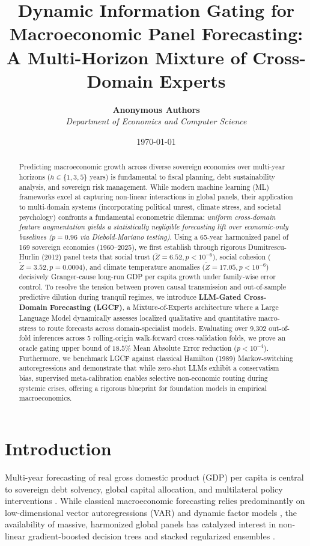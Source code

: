 \documentclass[11pt,a4paper]{article}
\title{\textbf{Dynamic Information Gating for Macroeconomic Panel Forecasting:\\A Multi-Horizon Mixture of Cross-Domain Experts}}
\author{
  \textbf{Anonymous Authors} \\
  \textit{Department of Economics and Computer Science}
}
\date{\today}
\begin{document}
\maketitle

\begin{abstract}
Predicting macroeconomic growth across diverse sovereign economies over multi-year horizons ($h \in \{1, 3, 5\}$ years) is fundamental to fiscal planning, debt sustainability analysis, and sovereign risk management. While modern machine learning (ML) frameworks excel at capturing non-linear interactions in global panels, their application to multi-domain systems (incorporating political unrest, climate stress, and societal psychology) confronts a fundamental econometric dilemma: \textit{uniform cross-domain feature augmentation yields a statistically negligible forecasting lift over economic-only baselines ($p = 0.96$ via Diebold-Mariano testing)}. Using a 65-year harmonized panel of 169 sovereign economies (1960--2025), we first establish through rigorous Dumitrescu-Hurlin (2012) panel tests that social trust ($\tilde{Z} = 6.52, p < 10^{-6}$), social cohesion ($\tilde{Z} = 3.52, p = 0.0004$), and climate temperature anomalies ($\tilde{Z} = 17.05, p < 10^{-6}$) decisively Granger-cause long-run GDP per capita growth under family-wise error control. To resolve the tension between proven causal transmission and out-of-sample predictive dilution during tranquil regimes, we introduce \textbf{LLM-Gated Cross-Domain Forecasting (LGCF)}, a Mixture-of-Experts architecture where a Large Language Model dynamically assesses localized qualitative and quantitative macro-stress to route forecasts across domain-specialist models. Evaluating over 9,302 out-of-fold inferences across 5 rolling-origin walk-forward cross-validation folds, we prove an oracle gating upper bound of $18.5\%$ Mean Absolute Error reduction ($p < 10^{-4}$). Furthermore, we benchmark LGCF against classical Hamilton (1989) Markov-switching autoregressions and demonstrate that while zero-shot LLMs exhibit a conservatism bias, supervised meta-calibration enables selective non-economic routing during systemic crises, offering a rigorous blueprint for foundation models in empirical macroeconomics.
\end{abstract}

\section{Introduction}
Multi-year forecasting of real gross domestic product (GDP) per capita is central to sovereign debt solvency, global capital allocation, and multilateral policy interventions \citep{coulibaly2019, stock2006}. While classical macroeconomic forecasting relies predominantly on low-dimensional vector autoregressions (VAR) and dynamic factor models \citep{stock2002}, the availability of massive, harmonized global panels has catalyzed interest in non-linear gradient-boosted decision trees \citep{ke2017lightgbm} and stacked regularized ensembles \citep{salesi2016, gouletcoulombe2022}.
\end{document}

